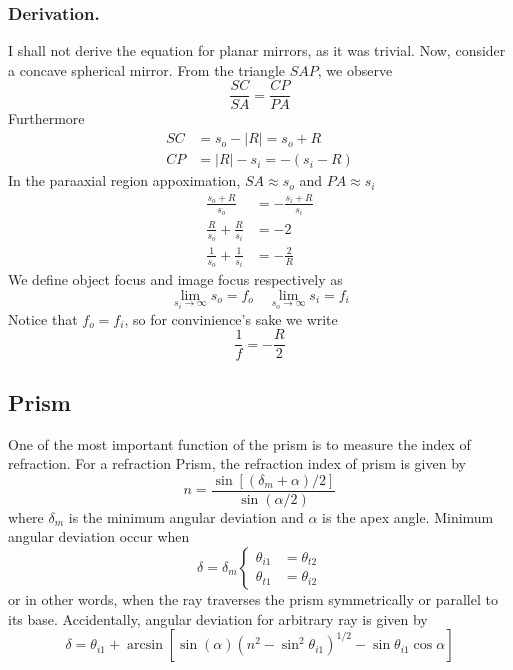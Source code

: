 \documentclass[../../../main.tex]{subfiles}
\begin{document}
\subsubsection*{Derivation.}
I shall not derive the equation for planar mirrors, as it was trivial. Now, consider a concave spherical mirror. From the triangle $SAP$, we observe 
\begin{equation*}
    \frac{SC}{SA}=\frac{CP}{PA}
\end{equation*}
Furthermore
\begin{align*}
    SC&=s_o-|R|=s_o+R\\
    CP&=|R|-s_i=-(s_i-R)
\end{align*}
In the paraaxial region appoximation, $SA\approx s_o$ and $PA\approx s_i$
\begin{align*}
    \frac{s_o+R}{s_o}&=-\frac{s_i+R}{s_i}\\
    \frac{R}{s_o}+\frac{R}{s_i}&=-2\\
    \frac{1}{s_o}+\frac{1}{s_i}&=-\frac{2}{R}
\end{align*}
We define object focus and image focus respectively as 
\begin{equation*}
    \lim_{s_i\rightarrow\infty}s_o=f_o\quad\lim_{s_o\rightarrow\infty}s_i=f_i
\end{equation*}
Notice that $f_o=f_i$, so for convinience's sake we write 
\begin{equation*}
    \frac{1}{f}=-\frac{R}{2}
\end{equation*}

\subsection*{Prism}
One of the most important function of the prism is to measure the index of refraction. For a refraction Prism, the refraction index of prism is given by 
\begin{equation*}
    n=\frac{\sin [(\delta_m+\alpha)/2]}{\sin (\alpha/2)}
\end{equation*}
where $\delta_m$ is the minimum angular deviation and $\alpha$ is the apex angle. Minimum angular deviation occur when 
\begin{equation*}
    \delta=\delta_m\begin{cases}
        \theta_{i1}&=\theta_{t2}\\
        \theta_{t1}&=\theta_{i2}
    \end{cases}
\end{equation*}
or in other words, when the ray traverses the prism symmetrically or parallel to its base. Accidentally, angular deviation for arbitrary ray is given by 
\begin{equation*}
    \delta=\theta_{i1}+\arcsin\left[ \sin (\alpha)\left(n^2-\sin^2\theta_{i1}\right)^{1/2}-\sin\theta_{i1}\cos\alpha\right]
\end{equation*}
\end{document}
